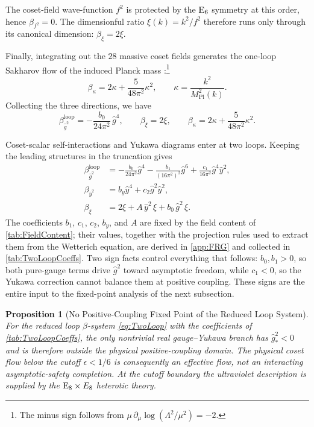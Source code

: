 \documentclass[pdflatex,sn-mathphys-num]{sn-jnl}
\theoremstyle{thmstyleone}
\newtheorem{proposition}[proposition]{Proposition}
\theoremstyle{thmstylethree}%
\theoremstyle{thmstyletwo}%
\begin{document}
The coset-field wave-function $f^{2}$ is protected by the
$\mathrm{E}_{6}$ symmetry at this order, hence $\beta_{f^{2}}=0$.
The dimensionful ratio
\(
  \xi(k)=k^{2}/f^{2}
\)
therefore runs only through its canonical dimension:
\(
  \beta_{\xi}=2\xi.
\)

Finally, integrating out the $28$ massive coset fields generates the
one-loop Sakharov flow of the induced Planck mass
\cite{SakharovInducedGravity,AdlerInducedGravity}:\footnote{%
  The minus sign follows from
  $\mu\,\partial_{\mu}\log(\Lambda^{2}/\mu^{2})=-2$.}
\[
  \beta_{\kappa}
  = 2\kappa
    +\frac{5}{48\pi^{2}}\kappa^{2},
  \qquad
  \kappa=\frac{k^{2}}{M_{\mathrm{Pl}}^{2}(k)}.
\]
Collecting the three directions, we have
\begin{equation}\label{eq:OneLoop}
    \beta_{\hat g^{2}}^{\mathrm{loop}}
      =-\frac{b_{0}}{24\pi^{2}}\,\hat g^{4},\qquad
    \beta_{\xi}=2\xi,\qquad
    \beta_{\kappa}=2\kappa+\frac{5}{48\pi^{2}}\kappa^{2}.
\end{equation}

Coset-scalar self-interactions and Yukawa diagrams enter at two loops. Keeping
the leading structures in the truncation gives
\begin{equation}\label{eq:TwoLoop}
\begin{aligned}
\beta_{\hat g^{2}}^{\mathrm{loop}}
 &= -\frac{b_{0}}{24\pi^{2}}\hat g^{4}
   -\frac{b_{1}}{(16\pi^{2})^{2}}\hat g^{6}
   +\frac{c_{1}}{16\pi^{2}}\hat g^{4}\hat y^{2},
\\[6pt]
\beta_{\hat y^{2}}
 &= b_{y} \hat y^{4}
    + c_{2}\hat g^{2}\hat y^{2},\\[6pt]
\beta_{\xi}
 &= 2\xi + A\,\hat y^{2}\,\xi + b_{0}\,\hat g^{2}\,\xi.
\end{aligned}
\end{equation}
The coefficients $b_{1}$, $c_{1}$, $c_{2}$, $b_{y}$, and $A$ are fixed by the
field content of \autoref{tab:FieldContent}; their values, together with the
projection rules used to extract them from the Wetterich equation, are derived
in \autoref{app:FRG} and collected in \autoref{tab:TwoLoopCoeffs}. Two sign
facts control everything that follows: $b_{0},b_{1}>0$, so both pure-gauge
terms drive $\hat g^{2}$ toward asymptotic freedom, while $c_{1}<0$, so the
Yukawa correction cannot balance them at positive coupling. These signs are
the entire input to the fixed-point analysis of the next subsection.

\begin{proposition}[No Positive-Coupling Fixed Point of the Reduced Loop System]
\label{thm:FixedPoint}
For the reduced loop $\beta$-system \eqref{eq:TwoLoop} with the coefficients of
\autoref{tab:TwoLoopCoeffs}, the only nontrivial real gauge--Yukawa branch has
\(
  \hat g^{2}_{\ast}<0
\)
and is therefore outside the physical positive-coupling domain. The physical
coset flow below the cutoff \(\epsilon<1/6\) is consequently an effective
flow, not an interacting asymptotic-safety completion. At the cutoff boundary
the ultraviolet description is supplied by the
\(\mathrm{E}_{8}\times E_{8}\) heterotic theory.
\end{proposition}
\end{document}
